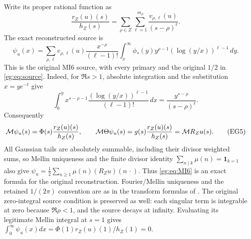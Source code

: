 \documentclass[11pt]{article}
\begin{document}
Write its proper rational function as
\[
 \frac{r_Z(u)(s)}{h_Z(s)}=
 \sum_{\rho\in Z}\sum_{\ell=1}^{m_\rho}
                  \frac{v_{\rho,\ell}(u)}{(s-\rho)^\ell}.
 \tag{EG3}\label{eg:eq:rational-source}
\]
The exact reconstructed source is
\[
 \psi_u(x)=\sum_{\rho,\ell}v_{\rho,\ell}(u)
 \frac{x^{-\rho}}{(\ell-1)!}
 \int_x^\infty\phi_*(y)y^{\rho-1}
                         (\log(y/x))^{\ell-1}\,dy.
 \tag{EG4}\label{eg:eq:MI6}
\]
This is the original MI6 source, with every primary and the original
$1/2$ in \eqref{eg:eq:source}. Indeed, for $\Re s>1$, absolute integration
and the substitution $x=ye^{-t}$ give
\[
 \int_0^y x^{s-\rho-1}\frac{(\log(y/x))^{\ell-1}}{(\ell-1)!}\,dx
       =\frac{y^{s-\rho}}{(s-\rho)^\ell}.
\]
Consequently
\[
 \mathcal M\psi_u(s)=\Phi(s)\frac{r_Z(u)(s)}{h_Z(s)},\qquad
 \mathcal M\Theta\psi_u(s)=g(s)\frac{r_Z(u)(s)}{h_Z(s)}=\mathcal M R_Zu(s).
 \tag{EG5}\label{eg:eq:source-Mellin}
\]
All Gaussian tails are absolutely summable, including their divisor
weighted sums, so Mellin uniqueness and the finite divisor identity
$\sum_{n\mid k}\mu(n)=\mathbf1_{k=1}$ also give
$\psi_u=\frac12\sum_{n\ge1}\mu(n)(R_Zu)(n\,\cdot)$.
Thus \eqref{eg:eq:MI6} is an exact formula for the original reconstruction.
Fourier/Mellin uniqueness and the retained $1/(2\pi)$ convention are
as in the transform formulas of \cite{eg:DLMFTransforms}.
The original zero-integral source condition is preserved as well:
each singular term is integrable at zero because $\Re\rho<1$, and
the source decays at infinity. Evaluating its legitimate Mellin
integral at $s=1$ gives
$\int_0^\infty\psi_u(x)dx=\Phi(1)r_Z(u)(1)/h_Z(1)=0$.
\end{document}
